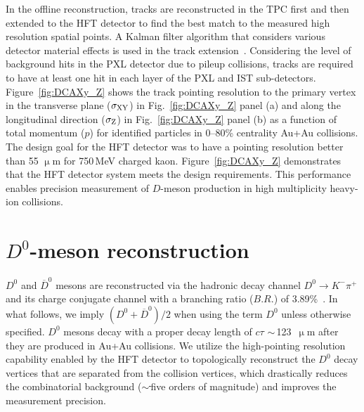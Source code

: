 \documentclass[%
 reprint,	
showpacs,
 amsmath,amssymb,
 aps,
 prc,
]{revtex4-1}
\providecommand{\DIFaddtex}[1]{{\protect\color{blue}\uwave{#1}}} %
\providecommand{\DIFdeltex}[1]{{\protect\color{red}\sout{#1}}}                      %
\providecommand{\DIFaddbegin}{} %
\providecommand{\DIFaddend}{} %
\providecommand{\DIFdelbegin}{} %
\providecommand{\DIFdelend}{} %
\providecommand{\DIFadd}[1]{\texorpdfstring{\DIFaddtex{#1}}{#1}} %
\providecommand{\DIFdel}[1]{\texorpdfstring{\DIFdeltex{#1}}{}} %
\begin{document}
In the offline reconstruction, tracks are reconstructed in the TPC first and then extended to the HFT detector to find the best match to the measured high resolution spatial points. A Kalman filter algorithm that considers various detector material effects is used in the track extension~\cite{Kalman}. Considering the level of background hits in the PXL detector due to pileup collisions, tracks are required to have at least one hit in each layer of the PXL and IST sub-detectors. Figure~\ref{fig:DCAXy_Z} shows the track pointing resolution to the primary vertex in the transverse plane ($\sigma_{\rm XY}$) in Fig.~\ref{fig:DCAXy_Z} panel (a) and along the longitudinal direction ($\sigma_{\rm Z}$) in Fig.~\ref{fig:DCAXy_Z} panel (b) as a function of total momentum ($p$) for identified particles in 0--80\% centrality Au+Au collisions. The design goal for the HFT detector was to have a pointing resolution better than 55 $\upmu$m for 750\,MeV charged kaon. Figure~\ref{fig:DCAXy_Z} demonstrates that the HFT detector system meets the design requirements. This performance enables precision measurement of $D$-meson production in high multiplicity heavy-ion collisions.


\section{$D^0$-meson reconstruction}
\label{D0recon}

$D^0$ and $\overline{D}^{0}$ mesons are reconstructed via the hadronic decay channel $D^0\rightarrow K^-\pi^+$ and its charge conjugate channel with a branching ratio ($B.R.$) of 3.89\%~\cite{pdg}. In what follows, we imply $(D^0 +\overline{D}^{0})/2$ when using the term $D^0$ unless otherwise specified. $D^0$ mesons decay with a proper decay length of $c\tau$ \DIFdelbegin \DIFdel{$\sim$}\DIFdelend \DIFaddbegin \DIFadd{$\approx$}\DIFaddend \,123\ $\upmu$m after they are produced in Au+Au collisions. We utilize the high-pointing resolution capability enabled by the HFT detector to topologically reconstruct the $D^0$ decay vertices that are separated from the collision vertices, which drastically reduces the combinatorial background (\DIFdelbegin \DIFdel{$\sim$\,}\DIFdelend \DIFaddbegin \DIFadd{around }\DIFaddend five orders of magnitude) and improves the measurement precision.
\end{document}
